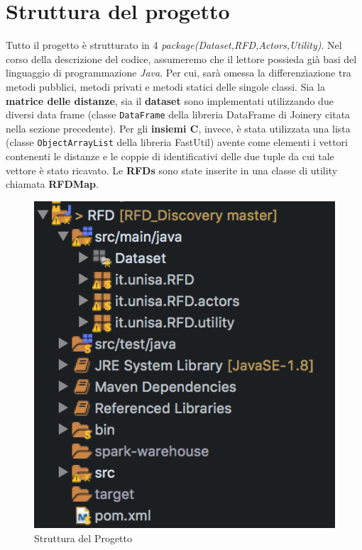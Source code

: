 \section{Struttura del progetto}
Tutto il progetto è strutturato in 4 \emph{package(Dataset,RFD,Actors,Utility)}.
Nel corso della descrizione del codice, assumeremo che il lettore possieda già basi del linguaggio di programmazione \emph{Java}. Per cui, sarà omessa la differenziazione tra metodi pubblici, metodi privati e metodi statici delle singole classi.
Sia la \textbf{matrice delle distanze}, sia il \textbf{dataset} sono implementati utilizzando due diversi data frame (classe \texttt{DataFrame} della libreria DataFrame di Joinery citata nella sezione precedente). Per gli \textbf{insiemi C}, invece, è stata utilizzata una lista (classe \texttt{ObjectArrayList} della libreria FastUtil) avente come elementi i vettori contenenti le distanze e  le coppie di identificativi delle due tuple da cui tale vettore è stato ricavato.
Le \textbf{RFDs} sono state inserite in una classe di utility chiamata \textbf{RFDMap}.
\begin{figure}[H]
	\centering
	\includegraphics{Immagini/StrutturaProgetto.png}
	\caption{Struttura del Progetto}
	\label{fig:StrutturaProgetto}
\end{figure}
